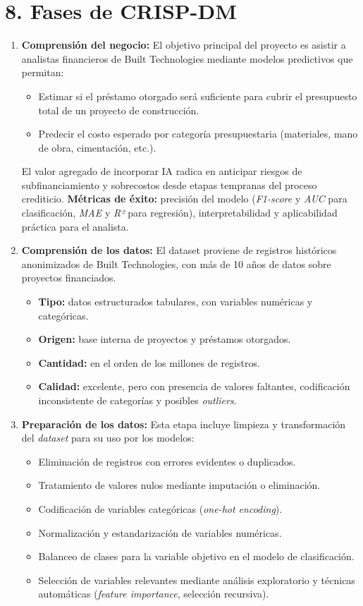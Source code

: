 \documentclass[
11pt, %
]{charter}
\begin{document}
\section{8. Fases de CRISP-DM}

\begin{enumerate}
  \item \textbf{Comprensión del negocio:}  
  El objetivo principal del proyecto es asistir a analistas financieros de Built Technologies mediante modelos predictivos que permitan:
  \begin{itemize}
    \item Estimar si el préstamo otorgado será suficiente para cubrir el presupuesto total de un proyecto de construcción.
    \item Predecir el costo esperado por categoría presupuestaria (materiales, mano de obra, cimentación, etc.).
  \end{itemize}
  El valor agregado de incorporar IA radica en anticipar riesgos de subfinanciamiento y sobrecostos desde etapas tempranas del proceso crediticio.  
  \textbf{Métricas de éxito:} precisión del modelo (\textit{F1-score} y \textit{AUC} para clasificación, \textit{MAE} y \textit{R²} para regresión), interpretabilidad y aplicabilidad práctica para el analista.

  \item \textbf{Comprensión de los datos:}  
  El dataset proviene de registros históricos anonimizados de Built Technologies, con más de 10 años de datos sobre proyectos financiados.  
  \begin{itemize}
    \item \textbf{Tipo:} datos estructurados tabulares, con variables numéricas y categóricas.
    \item \textbf{Origen:} base interna de proyectos y préstamos otorgados.
    \item \textbf{Cantidad:} en el orden de los millones de registros.
    \item \textbf{Calidad:} excelente, pero con presencia de valores faltantes, codificación inconsistente de categorías y posibles \textit{outliers}.
  \end{itemize}

  \item \textbf{Preparación de los datos:}  
  Esta etapa incluye limpieza y transformación del \textit{dataset} para su uso por los modelos:
  \begin{itemize}
    \item Eliminación de registros con errores evidentes o duplicados.
    \item Tratamiento de valores nulos mediante imputación o eliminación.
    \item Codificación de variables categóricas (\textit{one-hot encoding}).
    \item Normalización y estandarización de variables numéricas.
    \item Balanceo de clases para la variable objetivo en el modelo de clasificación.
    \item Selección de variables relevantes mediante análisis exploratorio y técnicas automáticas (\textit{feature importance}, selección recursiva).
  \end{itemize}


\end{enumerate}
\end{document}
